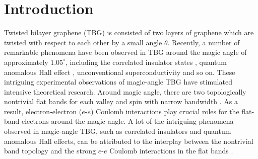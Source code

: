 \documentclass[aps,prx,10pt,twocolumn,superscriptaddress]{revtex4}
\begin{document}

\section{Introduction}
Twisted bilayer graphene (TBG) is consisted of two layers of graphene which are twisted with respect to each other by a small angle $\theta$. Recently, a number of remarkable phenomena have been observed in TBG around the magic angle of approximately $1.05^{\circ}$, including the correlated insulator states \cite{cao-nature18-mott,efetov-nature19,tbg-stm-pasupathy19,tbg-stm-andrei19,tbg-stm-yazdani19, tbg-stm-caltech19, young-tbg-science19, efetov-nature20, young-tbg-np20, li-tbg-science21}, quantum anomalous Hall effect \cite{young-tbg-science19, sharpe-science-19, efetov-arxiv20,yazdani-tbg-chern-arxiv20,andrei-tbg-chern-arxiv20,efetov-tbg-chern-arxiv20,pablo-tbg-chern-arxiv21,yang-tbg-cpl21}, unconventional superconductivity \cite{cao-nature18-supercond,dean-tbg-science19,marc-tbg-19, efetov-nature19, efetov-nature20, young-tbg-np20, li-tbg-science21, cao-tbg-nematic-science21} and so on. These intriguing experimental observations of magic-angle TBG have stimulated intensive  theoretical research. Around magic angle, there are two topologically nontrivial flat bands for each valley and spin with narrow bandwidth \cite{macdonald-pnas11,song-tbg-prl19, yang-tbg-prx19, po-tbg-prb19, origin-magic-angle-prl19, jpliu-prb19}. As a result, electron-electron ($e$-$e$) Coulomb interactions play crucial roles for the flat-band electrons around the magic angle.
A lot of the intriguing phenomena observed in magic-angle TBG, such as correlated insulators and quantum anomalous Hall effects, can be attributed to the interplay between the nontrivial band topology and the strong $e$-$e$ Coulomb interactions in the flat bands \cite{balents-review-tbg,andrei-review-tbg,jpliu-nrp21,kang-tbg-prl19,Uchoa-ferroMott-prl,xie-tbg-2018, wu-chiral-tbg-prb19,  zaletel-tbg-2019, wu-tbg-collective-prl20, zaletel-tbg-hf-prx20,jpliu-tbghf-prb21,zhang-tbghf-arxiv20,hejazi-tbg-hf,kang-tbg-dmrg-prb20,kang-tbg-topomott,yang-tbg-arxiv20,meng-tbg-arxiv20,Bernevig-tbg3-arxiv20,Lian-tbg4-arxiv20,regnault-tbg-ed,zaletel-dmrg-prb20,macdonald-tbg-ed-arxiv21,meng-tbg-qmc-cpl21,lee-tbg-qmc-arxiv21,bultinck-tbg-strain-prl21,tbg-ome-nc20,zhu-tbg-orb-prl20,Macdonald-ome-prl21,balents-cur-prb21}.
\end{document}
